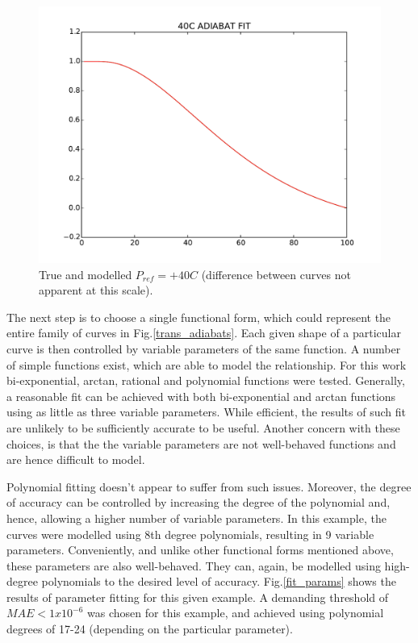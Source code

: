 \documentclass{article}
\begin{document}
\begin{figure}
\centering
\includegraphics[width=4.5in]{../figs/pref_fit.pdf}
\caption{True and modelled $P_{ref} = +40C$ (difference between curves not apparent at this scale).}\label{pref}
\end{figure}

The next step is to choose a single functional form, which could represent the entire family of curves in Fig.\ref{trans_adiabats}. Each given shape of a particular curve is then controlled by variable parameters of the same function. A number of simple functions exist, which are able to model the relationship. For this work bi-exponential, arctan, rational and polynomial functions were tested. Generally, a reasonable fit can be achieved with both bi-exponential and arctan functions using as little as three variable parameters. While efficient, the results of such fit are unlikely to be sufficiently accurate to be useful. Another concern with these choices, is that the the variable parameters are not well-behaved functions and are hence difficult to model. 

Polynomial fitting doesn't appear to suffer from such issues. Moreover, the degree of accuracy can be controlled by increasing the degree of the polynomial and, hence, allowing a higher number of variable parameters. In this example, the curves were modelled using 8th degree polynomials, resulting in 9 variable parameters. Conveniently, and unlike other functional forms mentioned above, these parameters are also well-behaved. They can, again, be modelled using high-degree polynomials to the desired level of accuracy. Fig.\ref{fit_params} shows the results of parameter fitting for this given example. A demanding threshold of $MAE<1x10^{-6}$ was chosen for this example, and achieved using polynomial degrees of 17-24 (depending on the particular parameter).
\end{document}
